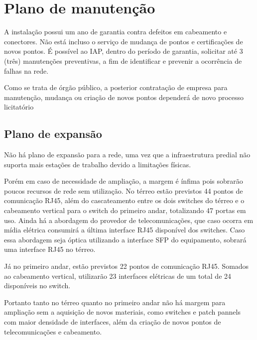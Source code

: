\documentclass[	DIV=calc,%
							paper=a4,%
							fontsize=12pt,%
							onecolumn]{scrartcl}	 					%
\begin{document}
\section{Plano de manutenção}
A instalação possui um ano de garantia contra defeitos em cabeamento e conectores. Não está incluso o serviço de mudança de pontos e certificações de novos pontos. É possível ao IAP, dentro do período de garantia, solicitar até 3 (três) manutenções preventivas, a fim de identificar e prevenir a ocorrência de falhas na rede.\par
Como se trata de órgão público, a posterior contratação de empresa para manutenção, mudança ou criação de novos pontos dependerá de novo processo licitatório


\subsection{Plano de expansão}
Não há plano de expansão para a rede, uma vez que a infraestrutura predial não suporta mais estações de trabalho devido a limitações físicas.\par
Porém em caso de necessidade de ampliação, a margem é ínfima pois sobrarão poucos recursos de rede sem utilização. No térreo estão previstos 44 pontos de comunicação RJ45, além do cascateamento entre os dois switches do térreo e o cabeamento vertical para o switch do primeiro andar, totalizando 47 portas em uso. Ainda há a abordagem do provedor de telecomunicações, que caso ocorra em mídia elétrica consumirá a última interface RJ45 disponível dos switches. Caso essa abordagem seja óptica utilizando a interface SFP do equipamento, sobrará uma interface RJ45 no térreo.\par
Já no primeiro andar, estão previstos 22 pontos de comunicação RJ45.  Somados ao cabeamento vertical, utilizarão 23 interfaces elétricas de um total de 24 disponíveis no switch.\par
Portanto tanto no térreo quanto no primeiro andar não há margem para ampliação sem a aquisição de novos materiais, como switches e patch pannels com maior densidade de interfaces, além da criação de novos pontos de telecomunicações e cabeamento.
\end{document}
